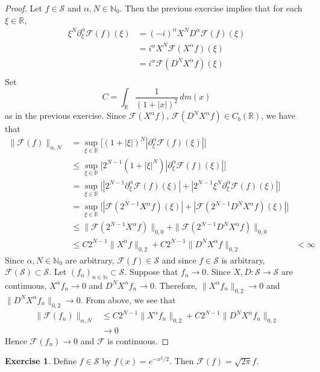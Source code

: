 \documentclass[12pt]{amsart}
\theoremstyle{definition}
\newtheorem{ex}[definition]{Exercise}
\newcommand{\p}{\partial}
\newcommand{\al}{\alpha}
\newcommand{\N}{\mathbb{N}}
\newcommand{\R}{\mathbb{R}}
\newcommand{\MF}{\mathcal{F}}
\newcommand{\MS}{\mathcal{S}}
\newcommand{\dm}{\, d m}
\begin{document}
	\begin{proof}
		Let $f \in \MS$ and $\al, N \in \N_0$. Then the previous exercise implies that for each $\xi \in \R$,
		\begin{align*}
			\xi^{N}\p_{\xi}^{\al} \MF(f)(\xi)
			& =  (-i)^{\al} X^{N} D^{\al} \MF(f)(\xi) \\
			&= i^{\al} X^N \MF(X^{\al} f)(\xi) \\
			&= i^{\al} \MF(D^{N} X^{\al} f)(\xi) \\ 
		\end{align*}
		Set 
		$$C = \int_{\R} \frac{1}{(1+|x|)^2} \dm(x)$$ 
		as in the previous exercise. Since $\MF(X^{\al}f)$, $\MF(D^NX^{\al}f) \in C_b(\R)$, we have that
		\begin{align*}
			\|\MF(f)\|_{\al, N}
			& = \sup_{\xi \in \R} \bigg[ (1 + |\xi|)^N |\p_{\xi}^{\al} \MF(f)(\xi)|\bigg] \\
			& \leq \sup_{\xi \in \R} \bigg[ 2^{N-1}(1 + |\xi|^N) |\p_{\xi}^{\al} \MF(f)(\xi)| \bigg] \\
			& = \sup_{\xi \in \R} \bigg[ |2^{N-1} \p_{\xi}^{\al} \MF(f)(\xi)| + |2^{N-1}\xi^N \p_{\xi}^{\al} \MF(f)(\xi)| \bigg] \\
			& = \sup_{\xi \in \R} \bigg[  |\MF( 2^{N-1} X^{\al} f)(\xi)| + |\MF(2^{N-1} D^N X^{\al} f)(\xi)| \bigg] \\
			& \leq  \| \MF( 2^{N-1} X^{\al} f) \|_{0,0} + \| \MF(2^{N-1} D^N X^{\al} f)\|_{0,0} \\
			& \leq C2^{N-1}\| X^{\al} f \|_{0,2} +  C2^{N-1}\|  D^N X^{\al} f\|_{0,2}
			& < \infty
		\end{align*}
		Since $\al, N \in \N_0$ are arbitrary, $\MF(f) \in \MS$ and since $f \in \MS$ is arbitrary, $\MF(\MS) \subset \MS$. Let $(f_n)_{n \in \N} \subset \MS$. Suppose that $f_n \rightarrow 0$. Since $X,D: \MS \rightarrow \MS$ are continuous, $X^{\al}f_n \rightarrow 0$ and $D^NX^\al f_n \rightarrow 0$. Therefore, $\|X^{\al}f_n\|_{0, 2} \rightarrow 0$ and $\|D^NX^{\al}f_n\|_{0, 2} \rightarrow 0$. From above, we see that 
		\begin{align*}
			\|\MF(f_n)\|_{\al, N} 
			& \leq C2^{N-1}\| X^{\al} f_n \|_{0,2} +  C2^{N-1}\|  D^N X^{\al} f_n \|_{0,2} \\
			& \rightarrow 0
		\end{align*}
		Hence $\MF(f_n) \rightarrow 0$ and $\MF$ is continuous. 
	\end{proof}

	\begin{ex}
		Define $f \in \MS$ by $f(x) = e^{-x^2/2}$. Then $\MF(f) = \sqrt{2 \pi}f$.
	\end{ex}
\end{document}
